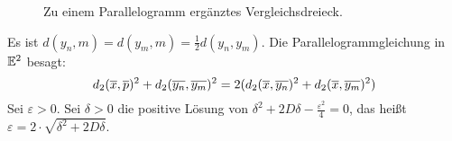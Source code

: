 \begin{beweis}
\begin{enumerate}[(i)]
\begin{figure}[h]
			\caption{Zu einem Parallelogramm ergänztes Vergleichsdreieck.}
			\label{abb:erg_parallel}
		\end{figure}
		
		Es ist $d(y_n,m) = d(y_m,m) = \frac{1}{2} d(y_n,y_m)$.
		Die Parallelogrammgleichung in $\mathbb{E}^2$ besagt:
		\[
			d_2(\overline{x},\overline{p})^2 + d_2(\overline{y_n},\overline{y_m})^2 = 2 (d_2(\overline{x},\overline{y_n})^2 + d_2(\overline{x},\overline{y_m})^2)
		\]
		Sei $\varepsilon > 0$. Sei $\delta > 0$ die positive Lösung von $\delta^2 + 2D\delta - \frac{\varepsilon^2}{4} = 0$, das heißt $\varepsilon = 2 \cdot \sqrt{\delta^2+2D\delta}$.
		

\end{enumerate}
\end{beweis}
